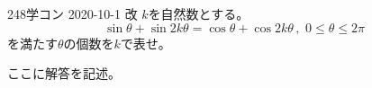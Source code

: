 \begin{prob}{248}{}{学コン 2020-10-1 改}
 $k$を自然数とする。
 \[ \sin\theta+\sin 2k\theta=\cos\theta+\cos 2k\theta \,,\,\, 0\le\theta\le 2\pi \]
 を満たす$\theta$の個数を$k$で表せ。
\end{prob}

ここに解答を記述。